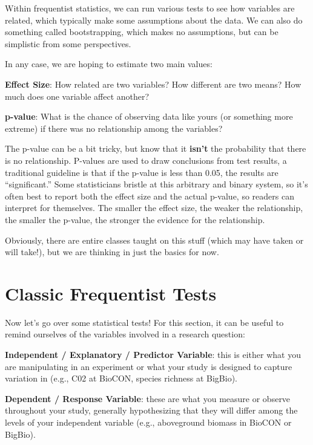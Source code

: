 \documentclass[
  letterpaper,
  DIV=11,
  numbers=noendperiod]{scrreprt}
\begin{document}
Within frequentist statistics, we can run various tests to see how
variables are related, which typically make some assumptions about the
data. We can also do something called bootstrapping, which makes no
assumptions, but can be simplistic from some perspectives.

In any case, we are hoping to estimate two main values:

\textbf{Effect Size}: How related are two variables? How different are
two means? How much does one variable affect another?

\textbf{p-value}: What is the chance of observing data like yours (or
something more extreme) if there was no relationship among the
variables?

The p-value can be a bit tricky, but know that it \textbf{isn't} the
probability that there is no relationship. P-values are used to draw
conclusions from test results, a traditional guideline is that if the
p-value is less than 0.05, the results are ``significant.'' Some
statisticians bristle at this arbitrary and binary system, so it's often
best to report both the effect size and the actual p-value, so readers
can interpret for themselves. The smaller the effect size, the weaker
the relationship, the smaller the p-value, the stronger the evidence for
the relationship.

Obviously, there are entire classes taught on this stuff (which may have
taken or will take!), but we are thinking in just the basics for now.

\hypertarget{classic-frequentist-tests}{%
\section{Classic Frequentist Tests}\label{classic-frequentist-tests}}

Now let's go over some statistical tests! For this section, it can be
useful to remind ourselves of the variables involved in a research
question:

\textbf{Independent / Explanatory / Predictor Variable}: this is either
what you are manipulating in an experiment or what your study is
designed to capture variation in (e.g., C02 at BioCON, species richness
at BigBio).

\textbf{Dependent / Response Variable}: these are what you measure or
observe throughout your study, generally hypothesizing that they will
differ among the levels of your independent variable (e.g., aboveground
biomass in BioCON or BigBio).
\end{document}
